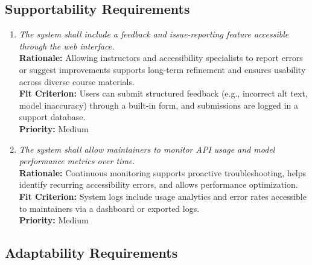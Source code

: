 \documentclass[12pt]{article}
\begin{document}
\subsection{Supportability Requirements}

\begin{enumerate}[label=MS-SUP\arabic*., wide=0pt, leftmargin=*]
  \item \emph{The system shall include a feedback and issue-reporting feature accessible through the web interface.}\\[2mm]
    {\bf Rationale:} Allowing instructors and accessibility specialists to report errors or suggest improvements supports long-term refinement and ensures usability across diverse course materials.\\
    {\bf Fit Criterion:} Users can submit structured feedback (e.g., incorrect alt text, model inaccuracy) through a built-in form, and submissions are logged in a support database.\\
    {\bf Priority:} Medium

  \item \emph{The system shall allow maintainers to monitor API usage and model performance metrics over time.}\\[2mm]
    {\bf Rationale:} Continuous monitoring supports proactive troubleshooting, helps identify recurring accessibility errors, and allows performance optimization.\\
    {\bf Fit Criterion:} System logs include usage analytics and error rates accessible to maintainers via a dashboard or exported logs.\\
    {\bf Priority:} Medium
\end{enumerate}

\subsection{Adaptability Requirements}
\end{document}
